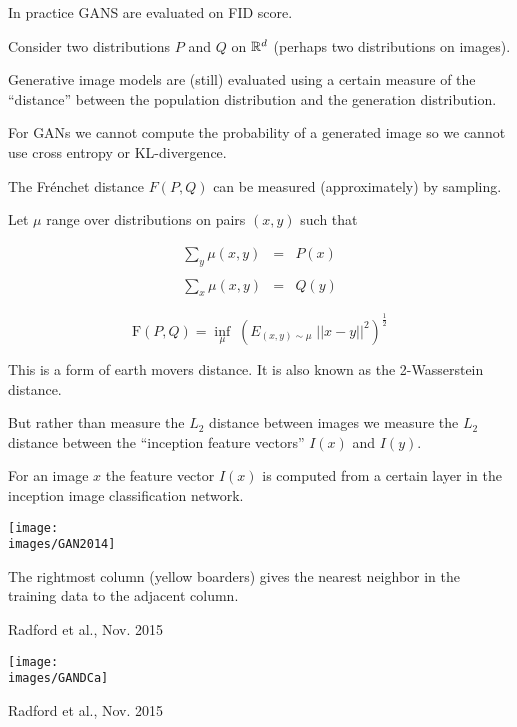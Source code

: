 {\vfill
In practice GANS are evaluated on FID score.


Consider two distributions $P$ and $Q$ on $\mathbb{R}^d$ (perhaps two distributions on images).

\vfill
Generative image models are (still) evaluated using a certain measure of the ``distance'' between the population distribution
and the generation distribution.

\vfill
For GANs we cannot compute the probability of a generated image so we cannot use cross entropy or KL-divergence.


The Fr\'{e}nchet distance $F(P,Q)$ can be measured (approximately) by sampling.

\vfill
Let $\mu$ range over distributions on pairs $(x,y)$ such that

\begin{eqnarray*}
\sum_y \mu(x,y) & = & P(x) \\
\\
\sum_x \mu(x,y) & = & Q(y)
\end{eqnarray*}

$$\mathrm{F}(P,Q) = \inf_{\mu}\;\left(E_{(x,y)\sim \mu} \;||x-y||^2\right)^{\frac{1}{2}}$$

\vfill
This is a form of earth movers distance.  It is also known as the 2-Wasserstein distance.


But rather than measure the $L_2$ distance between images we measure the $L_2$ distance between
the ``inception feature vectors'' $I(x)$ and $I(y)$.

\vfill
For an image $x$ the feature vector $I(x)$ is computed from a certain layer in the inception image classification network.

\centerline{\texttt{[image: \\images/GAN2014]}}
The rightmost column (yellow boarders) gives the nearest neighbor in the training data to the adjacent column.

{Radford et al., Nov. 2015}

\centerline{\texttt{[image: \\images/GANDCa]}}

{Radford et al., Nov. 2015}

}
